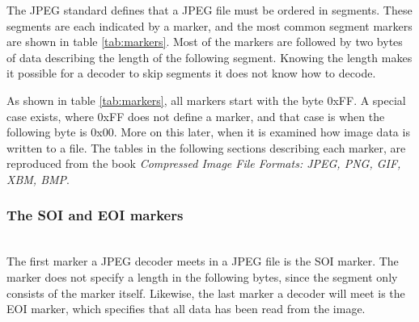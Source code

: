 \begin{infobox}
The JPEG standard defines that a JPEG file must be ordered in segments.
These segments are each indicated by a marker, and the most common segment markers are shown in table \ref{tab:markers}.
Most of the markers are followed by two bytes of data describing the length of the following segment.
Knowing the length makes it possible for a decoder to skip segments it does not know how to decode. 

As shown in table \ref{tab:markers}, all markers start with the byte 0xFF.
A special case exists, where 0xFF does not define a marker, and that case is when the following byte is 0x00.
More on this later, when it is examined how image data is written to a file.
The tables in the following sections describing each marker, are reproduced from the book \textit{Compressed Image File Formats: JPEG, PNG, GIF, XBM, BMP}\citep{Miano1999}.

\subsubsection{The SOI and EOI markers}
\begin{centering}
\hspace{1.2cm} 
\end{centering}\\
The first marker a JPEG decoder meets in a JPEG file is the SOI marker. 
The marker does not specify a length in the following bytes, since the segment only consists of the marker itself.
Likewise, the last marker a decoder will meet is the EOI marker, which specifies that all data has been read from the image.


\end{infobox}
